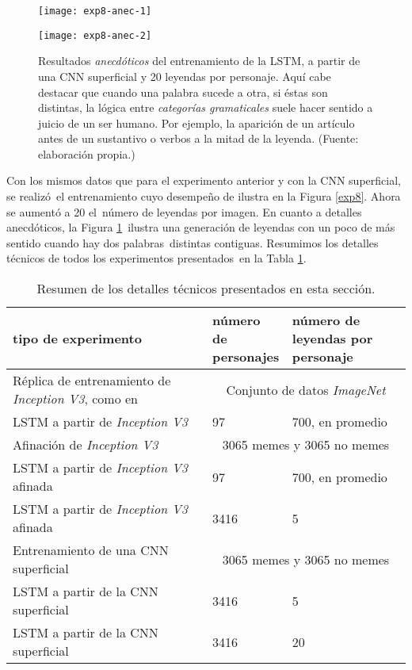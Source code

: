 \begin{figure}[H]
  \begin{minipage}[c]{\linewidth}
    \texttt{[image: exp8-anec-1]}
  \end{minipage}\hfill
  \begin{minipage}[c]{\linewidth}
    \texttt{[image: exp8-anec-2]}
  \end{minipage}
  \caption[Nota al pie]{
    Resultados \emph{anecdóticos} del entrenamiento de la LSTM, a partir de una CNN superficial
    y 20 leyendas por personaje. Aquí cabe destacar que cuando una palabra sucede a otra, si éstas son distintas,
    la lógica entre \emph{categorías gramaticales} suele hacer sentido a juicio de un ser humano.
    Por ejemplo, la aparición de un artículo antes de un sustantivo o verbos a la mitad de la leyenda.
    (Fuente: elaboración propia.)
  }
  \label{exp8:anec}
\end{figure}

Con los mismos datos que para el experimento anterior y con la CNN superficial, se realizó\
el entrenamiento cuyo desempeño de ilustra en la Figura \ref{exp8}. Ahora se aumentó a 20 el\
número de leyendas por imagen. En cuanto a detalles anecdóticos, la Figura \ref{exp8:anec}\
ilustra una generación de leyendas con un poco de más sentido cuando hay dos palabras\
distintas contiguas. Resumimos los detalles técnicos de todos los experimentos presentados\
en la Tabla \ref{exp-details}.

\begin{table}[H]
  \begin{tabular}{|p{0.5\linewidth}|p{0.2\linewidth}|p{0.3\linewidth}|}
    \hline
    \textbf{tipo de experimento} & \textbf{número de personajes} & \textbf{número de leyendas por personaje}\\
    \hline \hline
    Réplica de entrenamiento de \emph{Inception V3}, como en \cite{DBLP:journals/corr/VinyalsTBE16} & \multicolumn{2}{|c|}{Conjunto de datos \emph{ImageNet}} \\
    \hline
    LSTM a partir de \emph{Inception V3} & 97 & 700, en promedio \\
    \hline
    Afinación de \emph{Inception V3} & \multicolumn{2}{|c|}{3065 memes y 3065 no memes} \\
    \hline
    LSTM a partir de \emph{Inception V3} afinada & 97 & 700, en promedio \\
    \hline
    LSTM a partir de \emph{Inception V3} afinada & 3416 & 5 \\
    \hline
    Entrenamiento de una CNN superficial & \multicolumn{2}{|c|}{3065 memes y 3065 no memes} \\
    \hline
    LSTM a partir de la CNN superficial & 3416 & 5 \\
    \hline
    LSTM a partir de la CNN superficial & 3416 & 20 \\
    \hline
  \end{tabular}
  \caption{
    Resumen de los detalles técnicos presentados en esta sección.
  }
  \label{exp-details}
\end{table}

